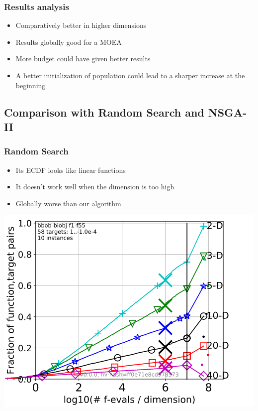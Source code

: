 \documentclass{beamer}
\begin{document}
\begin{frame}
  \frametitle{Results analysis}
  \begin{itemize}
  \item Comparatively better in higher dimensions
  \item Results globally good for a MOEA
  \end{itemize}
  \begin{itemize}
  \item More budget could have given better results
  \item A better initialization of population could lead to a sharper increase
    at the beginning
  \end{itemize}
\end{frame}

\subsection{Comparison with Random Search and NSGA-II}

\begin{frame}
\frametitle{Random Search}
\begin{itemize}
\item Its ECDF looks like linear functions
\item It doesn't work well when the dimension is too high
\item Globally worse than our algorithm
\end{itemize}
\centering \includegraphics[scale=0.35]{Random.png}
\end{frame}
\end{document}
